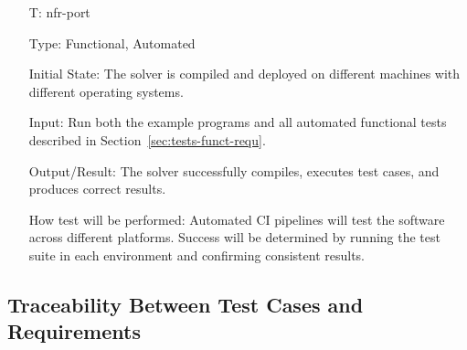 \documentclass[12pt, titlepage]{article}
\newcounter{testnum} %
\newcommand{\tref}[1]{T\ref{#1}}
\newcommand{\rref}[1]{R\ref{#1}}
\newcommand{\nfrref}[1]{NFR\ref{#1}}
\begin{document}
\begin{itemize}

\item[T\refstepcounter{testnum}\thetestnum \label{T:port}:]{nfr-port}

Type: Functional, Automated

Initial State: The solver is compiled and deployed on different machines with
different operating systems.

Input: Run both the example programs and all automated functional tests
described in Section~\ref{sec:tests-funct-requ}.

Output/Result: The solver successfully compiles, executes test cases, and
produces correct results.

How test will be performed: Automated CI pipelines will test the software across
different platforms. Success will be determined by running the test suite in
each environment and confirming consistent results.

\end{itemize}

\subsection{Traceability Between Test Cases and Requirements}

\end{document}
